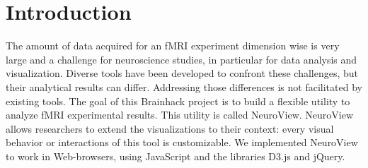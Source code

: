 \documentclass[twocolumn]{bmcart}%
\begin{document}
\begin{frontmatter}
\begin{fmbox}

	








%
\end{fmbox}%

\end{frontmatter}


\section{Introduction}\label{introduction}

The amount of data acquired for an fMRI experiment dimension wise is
very large and a challenge for neuroscience studies, in particular for
data analysis and visualization. Diverse tools have been developed to
confront these challenges, but their analytical results can differ.
Addressing those differences is not facilitated by existing tools. The
goal of this Brainhack project is to build a flexible utility to analyze
fMRI experimental results. This utility is called NeuroView. NeuroView
allows researchers to extend the visualizations to their context: every
visual behavior or interactions of this tool is customizable. We
implemented NeuroView to work in Web-browsers, using JavaScript and the
libraries D3.js and jQuery.
\end{document}
